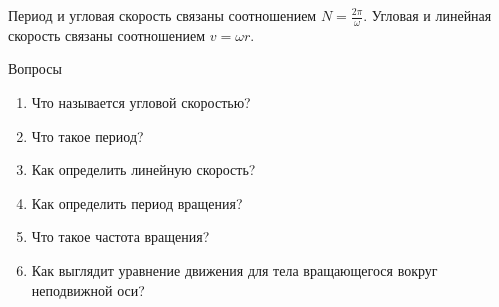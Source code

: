 \documentclass[a5paper, 10pt]{diss_4}
\renewcommand{\'}{\,'}
\begin{document}
  Период и угловая скорость связаны соотношением $N=\frac{2\pi}{\omega}$. Угловая и линейная
скорость связаны соотношением $v=\omega r$.

\begin{center}
   Вопросы
\end{center}
\begin{enumerate}
\item Что называется угловой скоростью?
\item Что такое период?
\item Как определить линейную скорость?
\item Как определить период вращения?
\item Что такое частота вращения?
\item Как выглядит уравнение движения для тела вращающегося вокруг неподвижной оси?
\end{enumerate}
\end{document}
